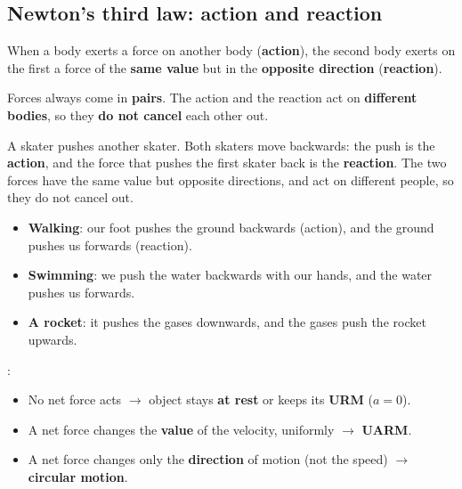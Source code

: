 \subsection{Newton's third law: action and reaction}

\begin{definition}
    When a body exerts a force on another body (\textbf{action}), the second body exerts on the first a force of the \textbf{same value} but in the \textbf{opposite direction} (\textbf{reaction}).
\end{definition}

\begin{impt}
    Forces always come in \textbf{pairs}. The action and the reaction act on \textbf{different bodies}, so they \textbf{do not cancel} each other out.
\end{impt}

\begin{example}
    A skater pushes another skater. Both skaters move backwards: the push is the \textbf{action}, and the force that pushes the first skater back is the \textbf{reaction}. The two forces have the same value but opposite directions, and act on different people, so they do not cancel out.
\end{example}

\begin{example}
    \begin{itemize}
        \item \textbf{Walking}: our foot pushes the ground backwards (action), and the ground pushes us forwards (reaction).
        \item \textbf{Swimming}: we push the water backwards with our hands, and the water pushes us forwards.
        \item \textbf{A rocket}: it pushes the gases downwards, and the gases push the rocket upwards.
    \end{itemize}
\end{example}

\begin{impt}
    :
    \begin{itemize}
        \item No net force acts \(\to\) object stays \textbf{at rest} or keeps its \textbf{URM} (\(a = 0\)).
        \item A net force changes the \textbf{value} of the velocity, uniformly \(\to\) \textbf{UARM}.
        \item A net force changes only the \textbf{direction} of motion (not the speed) \(\to\) \textbf{circular motion}.
    \end{itemize}
\end{impt}

